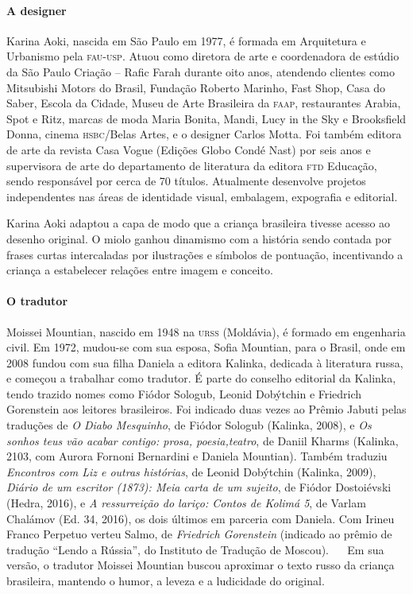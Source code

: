 \documentclass[11pt]{extarticle}
\begin{document}
\paragraph{A designer} Karina Aoki, nascida em São Paulo em 1977, é formada em Arquitetura e Urbanismo pela \textsc{fau-usp}. Atuou como diretora de arte e coordenadora de estúdio da São Paulo Criação -- Rafic Farah durante oito anos, atendendo clientes como Mitsubishi Motors do Brasil, Fundação Roberto Marinho, Fast Shop, Casa do Saber, Escola da Cidade, Museu de Arte Brasileira da \textsc{faap}, restaurantes Arabia, Spot e Ritz, marcas de moda Maria Bonita, Mandi, Lucy in the Sky e
Brooksfield Donna, cinema \textsc{hsbc}/Belas Artes, e o designer Carlos Motta. Foi também editora de arte da revista Casa Vogue (Edições Globo Condé Nast) por seis anos e supervisora de arte do departamento de literatura da editora \textsc{ftd} Educação, sendo responsável por cerca de 70 títulos. Atualmente desenvolve projetos independentes nas áreas de identidade visual, embalagem, expografia e editorial.

Karina Aoki adaptou a capa de modo que a criança brasileira tivesse acesso ao
desenho original. O miolo ganhou dinamismo com a história sendo contada por frases curtas
intercaladas por ilustrações e símbolos de pontuação, incentivando a criança a estabelecer
relações entre imagem e conceito.

\paragraph{O tradutor} 
Moissei Mountian, nascido em 1948 na \textsc{urss} (Moldávia), é formado em engenharia civil. Em 1972, mudou-se com sua esposa, Sofia Mountian, para o Brasil, onde em 2008 fundou com sua filha Daniela a editora Kalinka, dedicada à literatura russa, e começou a trabalhar como tradutor. É parte do conselho editorial da Kalinka, tendo trazido nomes como Fiódor Sologub, Leonid Dobýtchin e Friedrich Gorenstein aos leitores brasileiros. Foi indicado duas vezes ao Prêmio Jabuti pelas traduções de \textit{O Diabo Mesquinho}, de Fiódor Sologub (Kalinka, 2008), e \textit{Os sonhos teus vão acabar contigo: prosa, poesia,teatro}, de Daniil Kharms (Kalinka, 2103, com Aurora Fornoni Bernardini e Daniela Mountian). Também traduziu \textit{Encontros com Liz e outras histórias}, de Leonid Dobýtchin (Kalinka, 2009), \textit{Diário de um escritor (1873): Meia carta de um
sujeito}, de Fiódor Dostoiévski (Hedra, 2016), e \textit{A ressurreição do lariço: Contos de Kolimá 5}, de Varlam Chalámov (Ed. 34, 2016), os dois últimos em parceria com Daniela. Com Irineu Franco Perpetuo verteu Salmo, de \textit{Friedrich Gorenstein} (indicado ao prêmio de tradução “Lendo a Rússia”, do Instituto de Tradução de Moscou).
 
Em sua versão, o tradutor Moissei Mountian buscou aproximar o texto russo da criança
brasileira, mantendo o humor, a leveza e a ludicidade do original.
\end{document}
